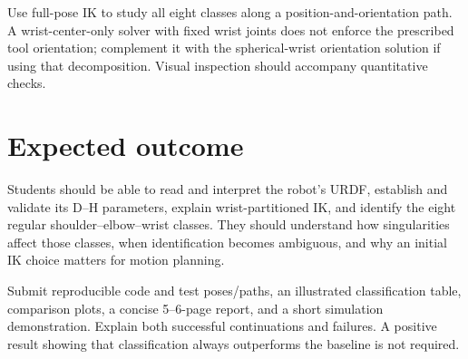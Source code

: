 \documentclass[11pt,a4paper]{article}
\begin{document}
Use full-pose IK to study all eight classes along a position-and-orientation
path. A wrist-center-only solver with fixed wrist joints does not enforce
the prescribed tool orientation; complement it with the spherical-wrist
orientation solution if using that decomposition. Visual inspection should
accompany quantitative checks.

\section*{Expected outcome}
Students should be able to read and interpret the robot's URDF, establish and
validate its D--H parameters, explain wrist-partitioned IK, and identify the eight
regular shoulder--elbow--wrist classes. They should understand how singularities
affect those classes, when identification becomes ambiguous, and why an initial
IK choice matters for motion planning.

Submit reproducible code and test poses/paths, an illustrated classification
table, comparison plots, a concise 5--6-page report, and a short simulation
demonstration. Explain both successful continuations and failures. A positive
result showing that classification always outperforms the baseline is not required.
\end{document}
